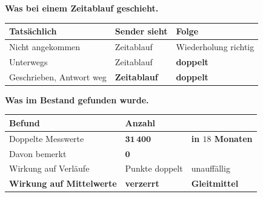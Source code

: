 \begin{merksatz}
\textbf{Was bei einem Zeitablauf geschieht.}

\begin{center}
{\small
\renewcommand{\arraystretch}{1.45}
\begin{tabular}{@{}P{2.8cm}P{2.4cm}P{2.6cm}@{}}
\toprule
\textbf{Tatsächlich} & \textbf{Sender sieht} & \textbf{Folge}\\
\midrule
Nicht angekommen & Zeitablauf & \textcolor{gruen}{Wiederholung richtig}\\
Unterwegs & Zeitablauf & \textcolor{akzent}{\textbf{doppelt}}\\
Geschrieben, Antwort weg & \textbf{Zeitablauf} & \textcolor{akzent}{\textbf{doppelt}}\\
\bottomrule
\end{tabular}}
\end{center}

\begin{center}
\begin{minipage}{0.88\textwidth}
\end{minipage}
\end{center}

\textbf{Was im Bestand gefunden wurde.}

\begin{center}
\renewcommand{\arraystretch}{1.45}
\begin{tabular}{@{}P{3.0cm}P{2.2cm}P{2.6cm}@{}}
\toprule
\textbf{Befund} & \textbf{Anzahl} & \\
\midrule
Doppelte Messwerte & $\mathbf{31\,400}$ & \textbf{in $18$ Monaten}\\
Davon bemerkt & $\mathbf{0}$ & \\
Wirkung auf Verläufe & \textcolor{mittel}{Punkte doppelt} & \textcolor{mittel}{unauffällig}\\
\textbf{Wirkung auf Mittelwerte} & \textcolor{akzent}{\textbf{verzerrt}} & \textcolor{akzent}{\textbf{Gleitmittel}}\\
\bottomrule
\end{tabular}
\end{center}

\begin{center}
\end{center}
\end{merksatz}

